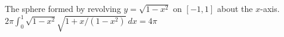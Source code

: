 {The sphere formed by revolving $y=\sqrt{1-x^2}$ on $[-1,1]$ about the $x$-axis.}
{$2\pi\int_0^1 \sqrt{1-x^2}\sqrt{1+x/(1-x^2)}\ dx = 4\pi$}
